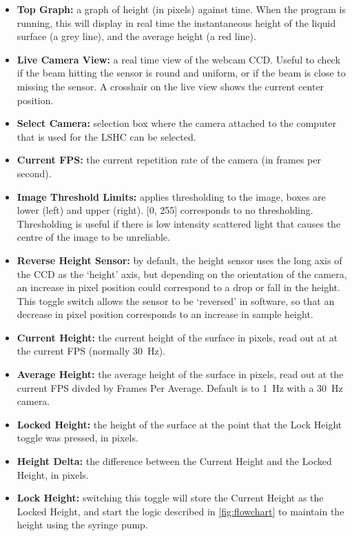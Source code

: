 \documentclass[11pt,a4paper,twoside]{article}
\begin{document}
\begin{itemize}

\item \textbf{Top Graph:} a graph of height (in pixels) against time. When the program is running, this will display in real time the instantaneous height of the liquid surface (a grey line), and the average height (a red line). 
\item \textbf{Live Camera View:} a real time view of the webcam CCD. Useful to check if the beam hitting the sensor is round and uniform, or if the beam is close to missing the sensor. A crosshair on the live view shows the current center position.
\item \textbf{Select Camera:} selection box where the camera attached to the computer that is used for the LSHC can be selected.
\item \textbf{Current FPS:} the current repetition rate of the camera (in frames per second). 
\item \textbf{Image Threshold Limits:} applies thresholding to the image, boxes are lower (left) and upper (right). [0, 255] corresponds to no thresholding. Thresholding is useful if there is low intensity scattered light that causes the centre of the image to be unreliable.
\item \textbf{Reverse Height Sensor:} by default, the height sensor uses the long axis of the CCD as the `height' axis, but depending on the orientation of the camera, an increase in pixel position could correspond to a drop or fall in the height. This toggle switch allows the sensor to be `reversed' in software, so that an decrease in pixel position corresponds to an increase in sample height.
\item \textbf{Current Height:} the current height of the surface in pixels, read out at at the current FPS (normally \SI{30}{\hertz}).
\item \textbf{Average Height:} the average height of the surface in pixels, read out at the current FPS divded by Frames Per Average. Default is to \SI{1}{\hertz} with a \SI{30}{\hertz} camera.
\item \textbf{Locked Height:} the height of the surface at the point that the Lock Height toggle was pressed, in pixels.
\item \textbf{Height Delta:} the difference between the Current Height and the Locked Height, in pixels.
\item \textbf{Lock Height:} switching this toggle will store the Current Height as the Locked Height, and start the logic described in \autoref{fig:flowchart} to maintain the height using the syringe pump.

\end{itemize}
\end{document}
